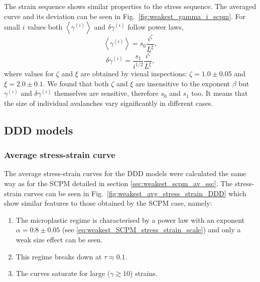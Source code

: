 The strain sequence shows similar properties to the stress sequence. The averaged curve and its deviation can be seen in Fig.~\ref{fig:weakest_gamma_i_scpm}. For small $i$ values both $\left\langle {{\gamma ^{\left( i \right)}}} \right\rangle $ and $\delta {\gamma ^{\left( i \right)}}$ follow power laws, 
\begin{equation} \label{eq:weakest_strain_sequence_average}
\left\langle {{\gamma ^{\left( i \right)}}} \right\rangle  = {s_0}\frac{{{i^\zeta }}}{{{L^\xi }}},
\end{equation}
\begin{equation} \label{eq:weakest_strain_sequence_std}
\delta {\gamma ^{\left( i \right)}} = \frac{{{s_1}}}{{{i^{1/2}}}}\frac{{{i^\zeta }}}{{{L^\xi }}},
\end{equation}
where values for $\zeta $ and $\xi $ are obtained by visual inspections: $\zeta  = 1.0 \pm 0.05$ and $\xi  = 2.0 \pm 0.1$. We found that both $\zeta $ and $\xi $ are insensitive to the exponent $\beta$ but ${{\gamma ^{\left( i \right)}}}$ and $\delta {\gamma ^{\left( i \right)}}$ themselves are sensitive, therefore $s_0$ and $s_1$ too. It means that the size of individual avalanches vary significantly in different cases.


\subsection{DDD models}
\subsubsection{Average stress-strain curve}

The average stress-strain curves for the DDD models were calculated the same way as for the SCPM detailed in section \ref{sec:weakest_scpm_av_ssc}. The stress-strain curves can be seen in Fig.~\ref{fig:weakest_avg_stress_strain_DDD} which show similar features to those obtained by the SCPM case, namely:
\begin{enumerate}
\item The microplastic regime is characterised by a power law with an exponent $\alpha  = 0.8 \pm 0.05$ (see \cref{eq:weakest_SCPM_stress_strain_scale}) and only a weak size effect can be seen.
\item This regime breaks down at $\tau  \approx 0.1$.
\item The curves saturate for large ($\gamma \gtrsim 10$) strains.
\end{enumerate}

